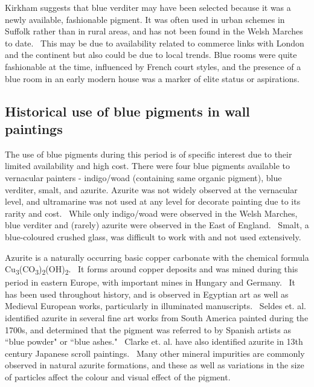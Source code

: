 Kirkham suggests that blue verditer may have been selected because it was a newly available, fashionable pigment. It was often used in urban schemes in Suffolk rather than in rural areas, and has not been found in the Welsh Marches to date.~\autocite{Kirkham_thesis,Baird_thesis} This may be due to availability related to commerce links with London and the continent but also could be due to local trends. Blue rooms were quite fashionable at the time, influenced by French court styles, and the presence of a blue room in an early modern house was a marker of elite status or aspirations.~\autocite{Kirkham_thesis}

\subsection[Historical use of blue pigments in wall paintings]{Historical use of blue pigments in wall paintings}
\label{subsection1.1.3}

The use of blue pigments during this period is of specific interest due to their limited availability and high cost. There were four blue pigments available to vernacular painters - indigo/woad (containing same organic pigment), blue verditer, smalt, and azurite. Azurite was not widely observed at the vernacular level, and ultramarine was not used at any level for decorate painting due to its rarity and cost.~\autocite{Kirkham_thesis} While only indigo/woad were observed in the Welsh Marches, blue verditer and (rarely) azurite were observed in the East of England.~\autocite{Baird_thesis,Davies_book,Kirkham_thesis} Smalt, a blue-coloured crushed glass, was difficult to work with and not used extensively.~\autocite{Kirkham_thesis}

Azurite is a naturally occurring basic copper carbonate with the chemical formula Cu\textsubscript{3}(CO\textsubscript{3})\textsubscript{2}(OH)\textsubscript{2}.~\autocite{Aru,Smieska} It forms around copper deposits and was mined during this period in eastern Europe, with important mines in Hungary and Germany.~\autocite{Aru} It has been used throughout history, and is observed in Egyptian art as well as Medieval European works, particularly in illuminated manuscripts.~\autocite{Smieska} Seldes et. al. identified azurite in several fine art works from South America painted during the 1700s, and determined that the pigment was referred to by Spanish artists as ``blue powder" or ``blue ashes."~\autocite{Seldes} Clarke et. al. have also identified azurite in 13th century Japanese scroll paintings.~\autocite{Clarke} Many other mineral impurities are commonly observed in natural azurite formations, and these as well as variations in the size of particles affect the colour and visual effect of the pigment.~\autocite{Smieska,Price,Cardell}

